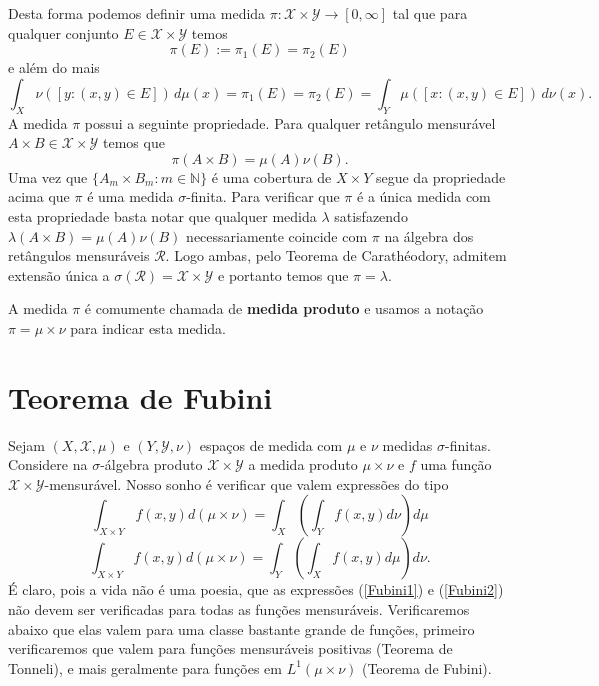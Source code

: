 Desta forma podemos definir uma medida 
$\pi:\mathscr{X}\times\mathscr{Y}\to [0,\infty]$ 
tal que para qualquer conjunto $E\in \mathscr{X}\times\mathscr{Y}$ 
temos 
\[
\pi(E) := \pi_1(E) = \pi_2(E)
\] 
e além do mais 
\[
	\int_{X} \nu([y:(x,y)\in E ])\, d\mu(x)
	=
	\pi_1(E)
	=
	\pi_2(E)
	=
	\int_{Y} \mu([x:(x,y)\in E ])\, d\nu(x).
\]
A medida $\pi$ possui a seguinte propriedade.
Para qualquer retângulo mensurável 
$A\times B\in \mathscr{X}\times\mathscr{Y}$ temos que 
\[
\pi(A\times B)=\mu(A)\nu(B).
\]
Uma vez que $\{A_m\times B_m: m\in \mathbb{N}\}$ é uma cobertura 
de $X\times Y$ segue da propriedade acima que 
$\pi$ é uma medida $\sigma$-finita. 
Para verificar que $\pi$ é a única medida com esta propriedade
basta notar que qualquer medida $\lambda$ satisfazendo 
$\lambda(A\times B)=\mu(A)\nu(B)$ necessariamente
coincide com $\pi$ na álgebra dos retângulos mensuráveis 
$\mathscr{R}$. Logo ambas, pelo Teorema de Carathéodory,
admitem extensão única a 
$\sigma(\mathscr{R})=\mathscr{X}\times\mathscr{Y}$ 
e portanto temos que $\pi=\lambda$.  

A medida $\pi$ é comumente chamada de \textbf{medida produto} e 
usamos a notação $\pi = \mu\times\nu$ para indicar esta medida.







\section{Teorema de Fubini}  
Sejam $(X, \mathscr{X}, \mu)$ e $(Y, \mathscr{Y}, \nu)$
espaços de medida com $\mu$ e $\nu$ medidas $\sigma$-finitas. 
Considere  na $\sigma$-álgebra
produto $\mathscr{X}\times \mathscr{Y}$ 
a medida produto $\mu\times \nu$ e $f$ uma função $\mathscr{X}\times \mathscr{Y}$-mensurável. Nosso sonho 
é verificar que valem expressões do tipo 
\begin{equation}\label{Fubini1}
\int_{X\times Y}f(x,y) d(\mu\times\nu)= \int_X(\int_Yf(x,y) d\nu)d\mu
\end{equation}
\begin{equation}\label{Fubini2}
\int_{X\times Y}f(x,y) d(\mu\times \nu)=\int_Y(\int_Xf(x,y) d\mu)d\nu.
\end{equation}
É claro, pois a vida não é uma poesia, que as expressões (\ref{Fubini1}) e (\ref{Fubini2}) não devem ser
verificadas para todas as funções mensuráveis. Verificaremos abaixo que elas valem para uma classe bastante 
grande de funções, primeiro verificaremos que valem para funções mensuráveis positivas (Teorema de Tonneli),
e mais geralmente para funções em $L^1(\mu\times \nu)$ (Teorema de Fubini).



